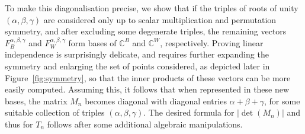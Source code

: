 \documentclass{article}
\begin{document}
To make this diagonalisation precise, we show that if the triples of roots of unity $(\alpha,\beta,\gamma)$ are considered only up to scalar multiplication and permutation symmetry, and after excluding some degenerate triples, the remaining vectors $F^{\alpha,\beta,\gamma}_B$ and $F^{\alpha,\beta,\gamma}_W$ form bases of $\mathbb{C}^B$ and $\mathbb{C}^W$, respectively. Proving linear independence is surprisingly delicate, and requires further expanding the symmetry and enlarging the set of points considered, as depicted later in Figure~\ref{fig:symmetry}, so that the inner products of these vectors can be more easily computed. Assuming this, it follows that when represented in these new bases, the matrix $M_n$ becomes diagonal with diagonal entries $\alpha+\beta+\gamma$, for some suitable collection of triples $(\alpha,\beta,\gamma)$. The desired formula for $|\det(M_n)|$ and thus for $T_n$ follows after some additional algebraic manipulations.
\end{document}
